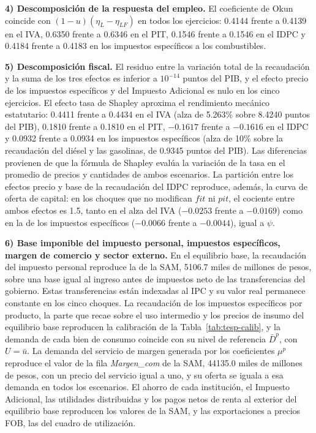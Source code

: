 \documentclass[11pt]{article}
\begin{document}
\textbf{4) Descomposición de la respuesta del empleo.} El coeficiente de Okun coincide con $(1-u)(\eta_{L}-\eta_{LF})$ en todos los ejercicios: 0.4144 frente a 0.4139 en el IVA, 0.6350 frente a 0.6346 en el PIT, 0.1546 frente a 0.1546 en el IDPC y 0.4184 frente a 0.4183 en los impuestos específicos a los combustibles.

\textbf{5) Descomposición fiscal.} El residuo entre la variación total de la recaudación y la suma de los tres efectos es inferior a $10^{-14}$ puntos del PIB, y el efecto precio de los impuestos específicos y del Impuesto Adicional es nulo en los cinco ejercicios. El efecto tasa de Shapley aproxima el rendimiento mecánico estatutario: 0.4411 frente a 0.4434 en el IVA (alza de 5.263\% sobre 8.4240 puntos del PIB), 0.1810 frente a 0.1810 en el PIT, $-0.1617$ frente a $-0.1616$ en el IDPC y 0.0932 frente a 0.0934 en los impuestos específicos (alza de 10\% sobre la recaudación del diésel y las gasolinas, de 0.9345 puntos del PIB). Las diferencias provienen de que la fórmula de Shapley evalúa la variación de la tasa en el promedio de precios y cantidades de ambos escenarios. La partición entre los efectos precio y base de la recaudación del IDPC reproduce, además, la curva de oferta de capital: en los choques que no modifican $fit$ ni $pit$, el cociente entre ambos efectos es 1.5, tanto en el alza del IVA ($-0.0253$ frente a $-0.0169$) como en la de los impuestos específicos ($-0.0066$ frente a $-0.0044$), igual a $\psi$.

\textbf{6) Base imponible del impuesto personal, impuestos específicos, margen de comercio y sector externo.} En el equilibrio base, la recaudación del impuesto personal reproduce la de la SAM, 5106.7 miles de millones de pesos, sobre una base igual al ingreso antes de impuestos neto de las transferencias del gobierno. Estas transferencias están indexadas al IPC y su valor real permanece constante en los cinco choques. La recaudación de los impuestos específicos por producto, la parte que recae sobre el uso intermedio y los precios de insumo del equilibrio base reproducen la calibración de la Tabla~\ref{tab:tesp-calib}, y la demanda de cada bien de consumo coincide con su nivel de referencia $\bar{D}^{p}$, con $U=\bar{u}$. La demanda del servicio de margen generada por los coeficientes $\mu^{p}$ reproduce el valor de la fila \textit{Margen\_com} de la SAM, 44135.0 miles de millones de pesos, con un precio del servicio igual a uno, y su oferta se iguala a esa demanda en todos los escenarios. El ahorro de cada institución, el Impuesto Adicional, las utilidades distribuidas y los pagos netos de renta al exterior del equilibrio base reproducen los valores de la SAM, y las exportaciones a precios FOB, las del cuadro de utilización.
\end{document}

